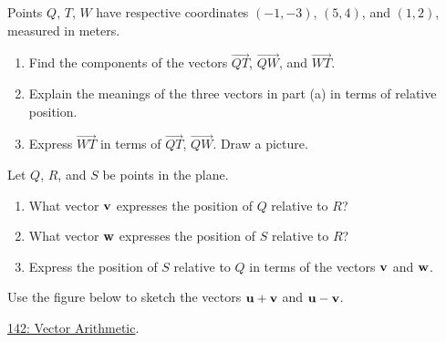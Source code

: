 \documentclass{ximera}
\begin{document}
\begin{question} \label{QDFEUJZXFedd}
Points $Q$, $T$, $W$ have respective coordinates $(-1,-3)$, $(5,4)$, and $(1,2)$, measured in meters.

\begin{enumerate}
\item Find the components of the vectors $\overrightarrow{QT}$, $\overrightarrow{QW}$, and $\overrightarrow{WT}$.

\item Explain the meanings of the three vectors in part (a) in terms of relative position.

\item Express $\overrightarrow{WT}$ in terms of $\overrightarrow{QT}$, $\overrightarrow{QW}$. Draw a picture.
\end{enumerate}

\end{question}


\begin{question}  \label{QodfderrewEWR}
Let $Q$, $R$, and $S$ be points in the plane.

\begin{enumerate}
\item What vector ${\bf v}$ expresses the position of $Q$ relative to $R$?

\item What vector ${\bf w}$ expresses the position of $S$ relative to $R$?

\item Express the position of $S$ relative to $Q$ in terms of the vectors ${\bf v}$ and ${\bf w}$.
\end{enumerate}
\end{question}

\begin{question}  \label{Q343g0dce}
Use the figure below to sketch the vectors ${\bf u}+{\bf v}$ and ${\bf u} - {\bf v}$.

\href{https://www.geogebra.org/classic/xunxnnyh}{142: Vector Arithmetic}.

 
\begin{onlineOnly}
    \begin{center}
\end{center}
\end{onlineOnly}

\end{question}
\end{document}
